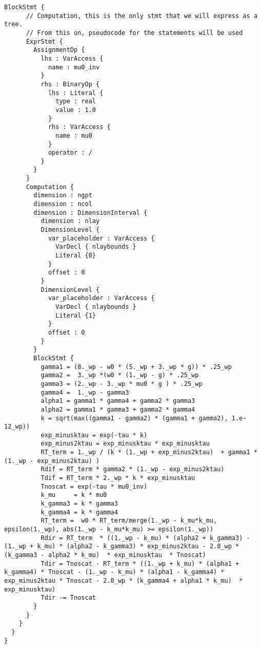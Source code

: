 \begin{lstlisting}[style=default]
    BlockStmt {
      // Computation, this is the only stmt that we will express as a tree. 
      // From this on, pseudocode for the statements will be used
      ExprStmt { 
        AssignmentOp {
          lhs : VarAccess {
            name : mu0_inv
          }
          rhs : BinaryOp {
            lhs : Literal {
              type : real
              value : 1.0
            }
            rhs : VarAccess {
              name : mu0
            }
            operator : /
          }
        }
      }
      Computation {
        dimension : ngpt
        dimension : ncol
        dimension : DimensionInterval {
          dimension : nlay
          DimensionLevel {
            var_placeholder : VarAccess { 
              VarDecl { nlaybounds }
              Literal {0}
            }
            offset : 0
          }
          DimensionLevel {
            var_placeholder : VarAccess { 
              VarDecl { nlaybounds }
              Literal {1}
            }
            offset : 0
          }
        }
        BlockStmt {
          gamma1 = (8._wp - w0 * (5._wp + 3._wp * g)) * .25_wp
          gamma2 =  3._wp *(w0 * (1._wp - g) * .25_wp
          gamma3 = (2._wp - 3._wp * mu0 * g ) * .25_wp
          gamma4 =  1._wp - gamma3
          alpha1 = gamma1 * gamma4 + gamma2 * gamma3 
          alpha2 = gamma1 * gamma3 + gamma2 * gamma4 
          k = sqrt(max((gamma1 - gamma2) * (gamma1 + gamma2), 1.e-12_wp))
          exp_minusktau = exp(-tau * k)
          exp_minus2ktau = exp_minusktau * exp_minusktau
          RT_term = 1._wp / (k * (1._wp + exp_minus2ktau)  + gamma1 * (1._wp - exp_minus2ktau) )
          Rdif = RT_term * gamma2 * (1._wp - exp_minus2ktau)
          Tdif = RT_term * 2._wp * k * exp_minusktau
          Tnoscat = exp(-tau * mu0_inv)
          k_mu     = k * mu0
          k_gamma3 = k * gamma3
          k_gamma4 = k * gamma4
          RT_term =  w0 * RT_term/merge(1._wp - k_mu*k_mu, epsilon(1._wp), abs(1._wp - k_mu*k_mu) >= epsilon(1._wp))
          Rdir = RT_term  * ((1._wp - k_mu) * (alpha2 + k_gamma3) -  (1._wp + k_mu) * (alpha2 - k_gamma3) * exp_minus2ktau - 2.0_wp * (k_gamma3 - alpha2 * k_mu)  * exp_minusktau  * Tnoscat)
          Tdir = Tnoscat - RT_term * ((1._wp + k_mu) * (alpha1 + k_gamma4) * Tnoscat - (1._wp - k_mu) * (alpha1 - k_gamma4) * exp_minus2ktau * Tnoscat - 2.0_wp * (k_gamma4 + alpha1 * k_mu)  * exp_minusktau)
          Tdir -= Tnoscat
        }   
      }
    }
  }
}
\end{lstlisting}
